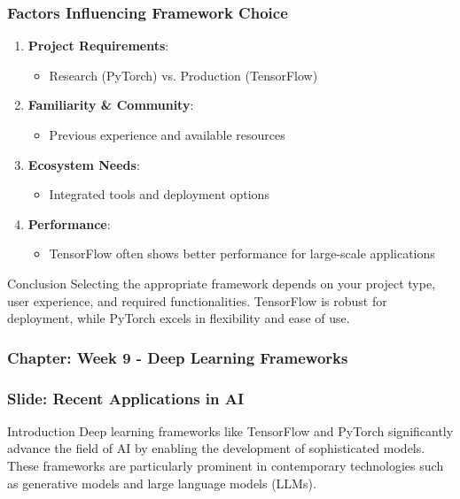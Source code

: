 \documentclass[aspectratio=169]{beamer}
\begin{document}
\begin{frame}[fragile]
    \frametitle{Factors Influencing Framework Choice}
    \begin{enumerate}
        \item \textbf{Project Requirements}:
            \begin{itemize}
                \item Research (PyTorch) vs. Production (TensorFlow)
            \end{itemize}
        \item \textbf{Familiarity \& Community}:
            \begin{itemize}
                \item Previous experience and available resources
            \end{itemize}
        \item \textbf{Ecosystem Needs}:
            \begin{itemize}
                \item Integrated tools and deployment options
            \end{itemize}
        \item \textbf{Performance}:
            \begin{itemize}
                \item TensorFlow often shows better performance for large-scale applications
            \end{itemize}
    \end{enumerate}
    
    \begin{block}{Conclusion}
        Selecting the appropriate framework depends on your project type, user experience, and required functionalities. TensorFlow is robust for deployment, while PyTorch excels in flexibility and ease of use.
    \end{block}
\end{frame}

\begin{frame}
    \frametitle{Chapter: Week 9 - Deep Learning Frameworks}
    \frametitle{Slide: Recent Applications in AI}
    \begin{block}{Introduction}
        Deep learning frameworks like TensorFlow and PyTorch significantly advance the field of AI by enabling the development of sophisticated models. 
        These frameworks are particularly prominent in contemporary technologies such as generative models and large language models (LLMs).
    \end{block}
\end{frame}
\end{document}
